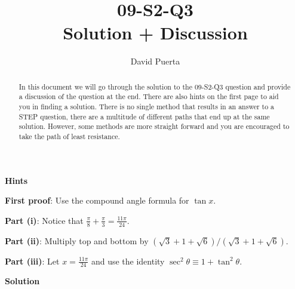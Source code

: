\documentclass{article}
\title{09-S2-Q3 \\ Solution + Discussion}
\author{David Puerta}
\date{}
\begin{document}
\maketitle

\begin{abstract}
    \noindent In this document we will go through the solution to the 09-S2-Q3 question and provide a discussion of the question at the end. There are also hints on the first page to aid you in finding a solution. There is no single method that results in an answer to a STEP question, there are a multitude of different paths that end up at the same solution. However, some methods are more straight forward and you are encouraged to take the path of least resistance.  
\end{abstract}

\vspace{1cm}

\begin{center}
    \textbf{Hints}
\end{center}

\textbf{First proof}: Use the compound angle formula for $\tan x$.

\vspace{1cm}

\textbf{Part (i)}:  Notice that $\frac{\pi}{8} + \frac{\pi}{3} = \frac{11\pi}{24}$.

\vspace{1cm}

\textbf{Part (ii)}: Multiply top and bottom by $(\sqrt{3} + 1 + \sqrt{6})/(\sqrt{3} + 1 + \sqrt{6})$.

\vspace{1cm}

\textbf{Part (iii)}: Let $x = \frac{11\pi}{24}$ and use the identity $\sec^2 \theta \equiv 1 + \tan^2 \theta$.


\newpage

\begin{center}
    \textbf{Solution}
\end{center}

\vspace{0.5cm}
\end{document}
